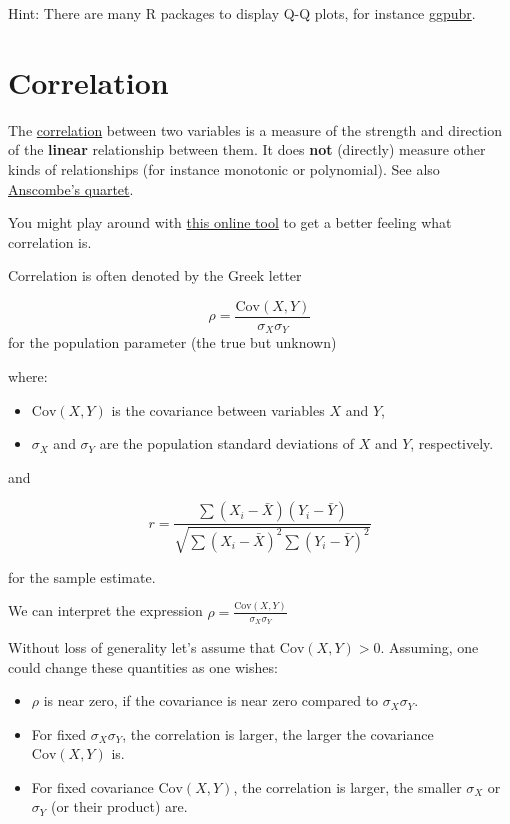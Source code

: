 \documentclass[
]{book}
\begin{document}
Hint: There are many R packages to display Q-Q plots, for instance \href{https://rpkgs.datanovia.com/ggpubr/reference/ggqqplot.html}{ggpubr}.

\section{Correlation}\label{correlation}

The \href{https://en.wikipedia.org/wiki/Correlation}{correlation} between two variables is a measure
of the strength and direction of the \textbf{linear} relationship between them. It does \textbf{not} (directly)
measure other kinds of relationships (for instance monotonic or polynomial).
See also \href{https://en.wikipedia.org/wiki/Anscombe\%27s_quartet}{Anscombe's quartet}.

You might play around with \href{https://rpsychologist.com/correlation/}{this online tool}
to get a better feeling what correlation is.

Correlation is often denoted by the Greek letter

\[\rho = \frac{\text{Cov}(X, Y)}{\sigma_X \sigma_Y}\]
for the population parameter (the true but unknown)

where:

\begin{itemize}
\item
  \(\text{Cov}(X, Y)\) is the covariance between variables \(X\) and \(Y\),
\item
  \(\sigma_X\) and \(\sigma_Y\) are the population standard deviations of \(X\) and \(Y\), respectively.
\end{itemize}

and

\[r = \frac{\sum (X_i - \bar{X})(Y_i - \bar{Y})}{\sqrt{\sum (X_i - \bar{X})^2 \sum (Y_i - \bar{Y})^2}}\]

for the sample estimate.

We can interpret the expression \(\rho = \frac{\text{Cov}(X, Y)}{\sigma_X \sigma_Y}\)

Without loss of generality let's assume that \(\text{Cov}(X, Y) > 0\). Assuming, one could change these quantities as one wishes:

\begin{itemize}
\item
  \(\rho\) is near zero, if the covariance is near zero compared to \(\sigma_X \sigma_Y\).
\item
  For fixed \(\sigma_X \sigma_Y\), the correlation is larger, the larger the covariance \(\text{Cov}(X, Y)\) is.
\item
  For fixed covariance \(\text{Cov}(X, Y)\), the correlation is larger, the smaller \(\sigma_X\) or \(\sigma_Y\) (or their product) are.
\end{itemize}
\end{document}
